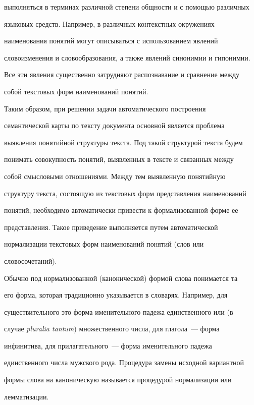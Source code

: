 выполняться в терминах различной степени общности и с помощью различных 

языковых средств. Например, в различных контекстных окружениях 

наименования понятий могут описываться с использованием явлений 

словоизменения и словообразования, а также явлений синонимии и гипонимии. 

Все эти явления существенно затрудняют распознавание и сравнение между 

собой текстовых форм наименований понятий. 

     

     Таким образом, при решении задачи автоматического построения 

семантической карты по тексту документа основной является проблема 

выявления понятийной структуры текста. Под такой структурой текста будем 

понимать совокупность понятий, выявленных в тексте и связанных между 

собой смысловыми отношениями. Между тем выявленную понятийную 

структуру текста, состоящую из текстовых форм представления наименований 

понятий, необходимо автоматически привести к формализованной форме ее 

представления. Такое приведение выполняется путем автоматической 

нормализации текстовых форм наименований понятий (слов или 

словосочетаний). 

    

    Обычно под нормализованной (канонической) формой слова понимается та 

его форма, которая традиционно указывается в словарях. Например, для 

существительного это форма именительного падежа единственного или (в 

случае \textit{pluralia tantum}) множественного числа, для глагола~--- форма 

инфинитива, для прилагательного~--- форма именительного падежа 

единственного числа мужского рода. Процедура замены исходной вариантной 

формы слова на каноническую называется процедурой нормализации или 

лемматизации.

